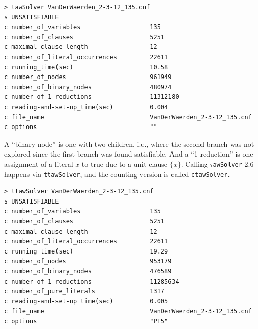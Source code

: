 \documentclass[final,3p,times]{elsarticle}
\theoremstyle{definition}
\newcommand{\set}[1]{\{#1\}}
\newcommand{\ttawsolver}{$\tau$\texttt{awSolver}-2.6}
\begin{document}
\begin{appendix}
\begin{verbatim}
> tawSolver VanDerWaerden_2-3-12_135.cnf
s UNSATISFIABLE
c number_of_variables                   135
c number_of_clauses                     5251
c maximal_clause_length                 12
c number_of_literal_occurrences         22611
c running_time(sec)                     10.58
c number_of_nodes                       961949
c number_of_binary_nodes                480974
c number_of_1-reductions                11312180
c reading-and-set-up_time(sec)          0.004
c file_name                             VanDerWaerden_2-3-12_135.cnf
c options                               ""
\end{verbatim}
A ``binary node'' is one with two children, i.e., where the second branch was not explored since the first branch was found satisfiable. And a ``1-reduction'' is one assignment of a literal $x$ to true due to a unit-clause $\set{x}$. Calling \ttawsolver{} happens via \texttt{ttawSolver}, and the counting version is called \texttt{ctawSolver}.
\begin{verbatim}
> ttawSolver VanDerWaerden_2-3-12_135.cnf
s UNSATISFIABLE
c number_of_variables                   135
c number_of_clauses                     5251
c maximal_clause_length                 12
c number_of_literal_occurrences         22611
c running_time(sec)                     19.29
c number_of_nodes                       953179
c number_of_binary_nodes                476589
c number_of_1-reductions                11285634
c number_of_pure_literals               1317
c reading-and-set-up_time(sec)          0.005
c file_name                             VanDerWaerden_2-3-12_135.cnf
c options                               "PT5"


\end{verbatim}
\end{appendix}
\end{document}
